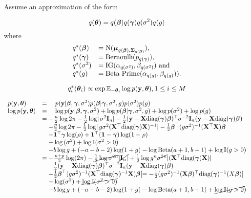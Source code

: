 \documentclass{amsart}[12pt]
\begin{document}
Assume an approximation of the form

\begin{equation*}
q({\boldsymbol \theta}) = q({\boldsymbol \beta}) q({\boldsymbol \gamma}) q(\sigma^2) q(g)
\end{equation*}
where
\begin{equation*}
\begin{array}{ll}
q^*({\boldsymbol \beta}) &= \text{N}({\boldsymbol \mu}_{q({\boldsymbol \beta}), {\boldsymbol \Sigma}_{q({\boldsymbol \beta})}}), \\
q^*({\boldsymbol \gamma}) &= \text{Bernoulli}(p_{q({\boldsymbol \gamma})}), \\
q^*(\sigma^2) &= \text{IG}(\alpha_{q(\sigma^2)}, \beta_{q(\sigma^2)}) \text{ and } \\
q^*(g) &= \text{Beta Prime}(\alpha_{q(g)}, \beta_{q(g)})). \\
\end{array}
\end{equation*}

\begin{equation*}
q_i^*({\boldsymbol \theta}_i) \propto \exp{ {\mathbb E}_{-{\boldsymbol\theta}_i} \log{p({\bf y}, {\boldsymbol\theta})} }, 1 \leq i \leq M
\end{equation*}

\begin{equation*}
\begin{array}{ll}
p({\bf y}, {\boldsymbol \theta}) &= \quad p({\bf y} | {\boldsymbol \beta}, {\boldsymbol \gamma}, \sigma^2) p({\boldsymbol \beta} | {\boldsymbol \gamma}, \sigma^2, g) p(\sigma^2) p(g) \\
\log{p({\bf y}, {\boldsymbol\theta})} &= \quad \log{p({\bf y}| {\boldsymbol\beta}, {\boldsymbol\gamma}, \sigma^2)} + \log{p({\boldsymbol\beta}| {\boldsymbol\gamma}, \sigma^2, g)} + \log{p(\sigma^2)} + \log{p(g)} \\
&= -\frac{n}{2} \log{2 \pi} -\tfrac{1}{2} \log |\sigma^2 {\bf I}_n| - \tfrac{1}{2} ({\bf y} - {\bf X} \text{diag}({\boldsymbol \gamma}) {\boldsymbol \beta})^\top \sigma^{-2} {\bf I}_n ({\bf y} - {\bf X} \text{diag}({\boldsymbol \gamma}) {\boldsymbol \beta}) \\
& \quad -\frac{p}{2} \log{2 \pi} - \tfrac{1}{2} \log |g \sigma^2 ({\bf X}^\top \text{diag}({\boldsymbol \gamma}) {\bf X})^{-1}| -
	\tfrac{1}{2} {\boldsymbol \beta}^\top (g \sigma^2)^{-1} ({\bf X}^\top {\bf X}) {\boldsymbol \beta} \\
& \quad + {\bf 1}^\top {\boldsymbol\gamma} \log(\rho) + {\bf 1}^\top ({\bf 1} - {\boldsymbol \gamma}) \log(1 - \rho)\\
& \quad - \log{(\sigma^2)} + \log {\mathbb I} (\sigma^2 > 0) \\
& \quad + b \log g + (-a - b - 2) \log(1 + g) - \log \text{Beta}(a + 1,  b + 1) + \log {\mathbb I}(g > 0)\\
& = -\frac{n + p}{2} \log(2 \pi) - \cancel{\tfrac{1}{2} \log{\sigma^{2n}}} \cancel{|{\bf I}_n|} 
		+\tfrac{1}{2} \log{g^n \cancel{\sigma^{2n}}} |({\bf X}^\top \text{diag}({\boldsymbol \gamma}) {\bf X})| \\
&\quad		-\tfrac{1}{2} ({\bf y} - {\bf X} \text{diag}({\boldsymbol \gamma}) {\boldsymbol \beta})^\top \sigma^{-2} {\bf I}_n ({\bf y} - {\bf X} \text{diag}({\boldsymbol \gamma}) {\boldsymbol \beta})\\
&\quad		-\tfrac{1}{2} {\boldsymbol \beta}^\top (g \sigma^2)^{-1} ({\bf X}^\top \text{diag}({\boldsymbol \gamma})^{-1} {\bf X}) {\boldsymbol \beta} [= -\tfrac{1}{2} (g \sigma^2)^{-1} ({\bf X} {\boldsymbol \beta})^\top \text{diag}({\boldsymbol \gamma})^{-1} (X {\boldsymbol \beta})]\\
&\quad - \log(\sigma^2) + \cancel{\log {\mathbb I}(\sigma^2 > 0)} \\
&\quad + b \log g + (-a - b - 2) \log(1 + g) - \log \text{Beta}(a + 1,  b + 1) + \cancel{\log {\mathbb I}(g > 0)}
\end{array}
\end{equation*}
\end{document}

